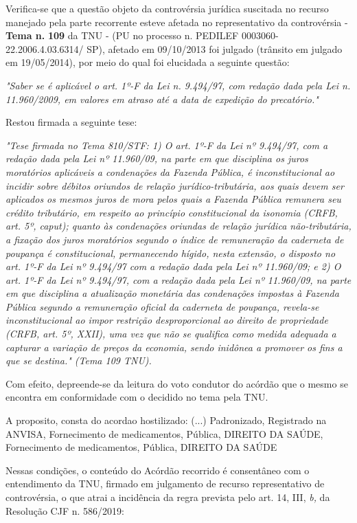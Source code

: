 \documentclass[12pt]{article}
\begin{document}
\justifying
\noindent Verifica-se que a questão objeto da controvérsia jurídica suscitada no recurso manejado pela parte recorrente esteve afetada no representativo da controvérsia - \textbf{Tema n. }\textbf{109} da TNU - (PU no processo n. PEDILEF 0003060-22.2006.4.03.6314/ SP),  afetado em 09/10/2013 foi julgado (trânsito em julgado em 19/05/2014), por meio do qual foi elucidada a seguinte questão:

\noindent \textit{"Saber se é aplicável o art. 1º-F da Lei n. 9.494/97, com redação dada pela Lei n. 11.960/2009, em valores em atraso até a data de expedição do precatório."}

\noindent Restou firmada a seguinte tese:

\noindent \textit{"Tese firmada no Tema 810/STF: 1) O art. 1º-F da Lei nº 9.494/97, com a redação dada pela Lei nº 11.960/09, na parte em que disciplina os juros moratórios aplicáveis a condenações da Fazenda Pública, é inconstitucional ao incidir sobre débitos oriundos de relação jurídico-tributária, aos quais devem ser aplicados os mesmos juros de mora pelos quais a Fazenda Pública remunera seu crédito tributário, em respeito ao princípio constitucional da isonomia (CRFB, art. 5º, caput); quanto às condenações oriundas de relação jurídica não-tributária, a fixação dos juros moratórios segundo o índice de remuneração da caderneta de poupança é constitucional, permanecendo hígido, nesta extensão, o disposto no art. 1º-F da Lei nº 9.494/97 com a redação dada pela Lei nº 11.960/09; e 2) O art. 1º-F da Lei nº 9.494/97, com a redação dada pela Lei nº 11.960/09, na parte em que disciplina a atualização monetária das condenações impostas à Fazenda Pública segundo a remuneração oficial da caderneta de poupança, revela-se inconstitucional ao impor restrição desproporcional ao direito de propriedade (CRFB, art. 5º, XXII), uma vez que não se qualifica como medida adequada a capturar a variação de preços da economia, sendo inidônea a promover os fins a que se destina." (Tema 109 TNU).}

\noindent Com efeito, depreende-se da leitura do voto condutor do acórdão que o mesmo se encontra em conformidade com o decidido no  tema pela TNU.

\noindent A proposito, consta do acordao hostilizado: (...) Padronizado, Registrado na ANVISA, Fornecimento de medicamentos, Pública, DIREITO DA SAÚDE, Fornecimento de medicamentos, Pública, DIREITO DA SAÚDE

\noindent Nessas condições, o conteúdo do Acórdão recorrido é consentâneo com o entendimento da TNU, firmado em julgamento de recurso representativo de controvérsia, o que atrai a incidência da regra prevista pelo art. 14, III, \textit{b,} da Resolução CJF n. 586/2019:
\end{document}
